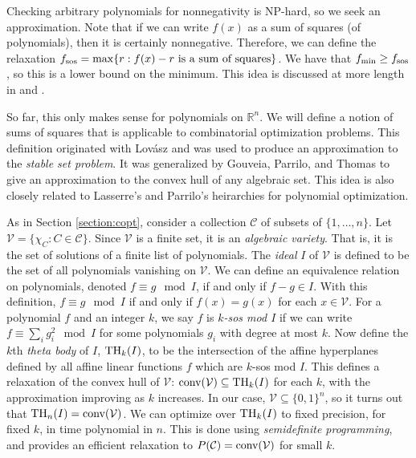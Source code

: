 Checking arbitrary polynomials for nonnegativity is NP-hard, so we seek an approximation.
Note that if we can write $f(x)$ as a sum of squares (of polynomials), then it is certainly nonnegative. 
Therefore, we can define the relaxation $f_{\textup{sos}} = \max \{r: f(x) - r \textup{ is a sum of squares}\}$.
We have that $f_{\min} \ge f_{\textup{sos}}$, so this is a lower bound on the minimum. 
This idea is discussed at more length in \cite{sostools} and \cite{lasserre}. 

So far, this only makes sense for polynomials on $\mathbb{R}^n$.
We will define a notion of sums of squares that is applicable to combinatorial optimization problems.
This definition originated with Lov\'asz \cite{lovasz} and was used to produce an approximation to the {\em stable set problem}.
It was generalized by Gouveia, Parrilo, and Thomas \cite{gpt} to give an approximation to the convex hull of any algebraic set.
This idea is also closely related to Lasserre's \cite{lasserre} and Parrilo's \cite{parrilo} \cite{parrilo2} heirarchies for polynomial optimization.

As in Section \ref{section:copt}, consider a collection $\mathcal{C}$ of subsets of $\{1, \ldots, n\}$. 
Let $\mathcal{V} = \{\chi_C: C \in \mathcal{C}\}$.
Since $\mathcal{V}$ is a finite set, it is an {\em algebraic variety}.
That is, it is the set of solutions of a finite list of polynomials.
The {\em ideal} $I$ of $\mathcal{V}$ is defined to be the set of all polynomials vanishing on $\mathcal{V}$.
We can define an equivalence relation on polynomials, denoted $f \equiv g \mod I$, if and only if $f - g \in I$.
With this definition, $f \equiv g \mod I$ if and only if $f(x) = g(x)$ for each $x \in \mathcal{V}$.
For a polynomial $f$ and an integer $k$, we say $f$ is {\em $k$-sos mod $I$} if we can write $f \equiv \sum_i g_i^2 \mod I$ for some polynomials $g_i$ with degree at most $k$.
Now define the $k$th {\em theta body} of $I$, $\textup{TH}_k(I)$, to be the intersection of the affine hyperplanes defined by all affine linear functions $f$ which are $k$-sos mod $I$. 
This defines a relaxation of the convex hull of $\mathcal{V}$: $\hbox{conv}(\mathcal{V}) \subseteq \textup{TH}_k(I)$ for each $k$, with the approximation improving as $k$ increases.
In our case, $\mathcal{V} \subseteq \{0,1\}^n$, so it turns out that $\textup{TH}_n(I) =  \hbox{conv}(\mathcal{V})$.
We can optimize over $\textup{TH}_k(I)$ to fixed precision, for fixed $k$,  in time polynomial in $n$.
This is done using {\em semidefinite programming}, and provides an efficient relaxation to $P(\mathcal{C}) = \hbox{conv}(\mathcal{V})$ for small $k$.


